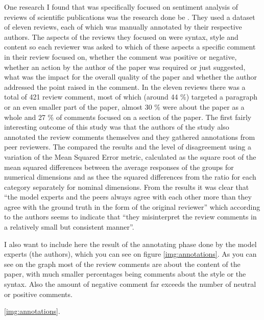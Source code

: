 One research I found that was specifically focused on sentiment analysis of reviews of scientific publications was the research done be \textcite{nano_peer}. They used a dataset of eleven reviews, each of which was manually annotated by their respective authors. The aspects of the reviews they focused on were syntax, style and content so each reviewer was asked to which of these aspects a specific comment in their review focused on, whether the comment was positive or negative, whether an action by the author of the paper was required or just suggested, what was the impact for the overall quality of the paper and whether the author addressed the point raised in the comment.\cite{nano_peer} In the eleven reviews there was a total of 421 review comment, most of which (around 44 \%) targeted a paragraph or an even smaller part of the paper, almost 30 \% were about the paper as a whole and 27 \% of comments focused on a section of the paper. 
The first fairly interesting outcome of this study was that the authors of the study also annotated the review comments themselves and they gathered annotations from peer reviewers. The compared the results and the level of disagreement using a variation of the Mean Squared Error metric, calculated as the square root of the mean squared differences between the average responses of the groups for numerical dimensions and as thee the squared
differences from the ratio for each category separately for nominal dimensions. From the results it was clear that ``the model experts and the
peers always agree with each other more than they agree with the
ground truth in the form of the original reviewer'' which according to the authors seems to indicate that ``they misinterpret the review comments in a relatively
small but consistent manner''\cite{nano_peer}.

I also want to include here the result of the annotating phase done by the model experts (the authors), which you can see on figure \ref{img:annotations}. As you can see on the graph most of the review comments are about the content of the paper, with much smaller percentages being comments about the style or the syntax. Also the amount of negative comment far exceeds the number of neutral or positive comments. 

 \ref{img:annotations}.

